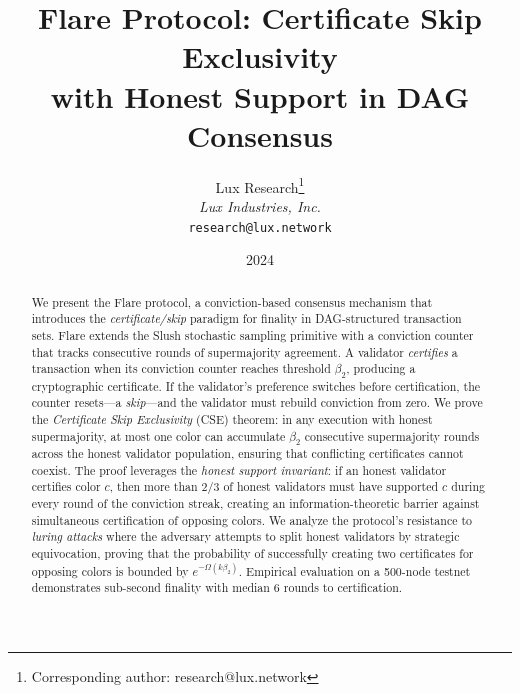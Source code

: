 \documentclass[11pt,a4paper]{article}
\title{\textbf{Flare Protocol: Certificate Skip Exclusivity\\with Honest Support in DAG Consensus}}
\author{
Lux Research\thanks{Corresponding author: research@lux.network}\\
\textit{Lux Industries, Inc.}\\
\texttt{research@lux.network}
}
\date{2024}
\begin{document}
\luxcoverpage

\begin{abstract}
We present the Flare protocol, a conviction-based consensus mechanism that introduces
the \emph{certificate/skip} paradigm for finality in DAG-structured transaction sets.
Flare extends the Slush stochastic sampling primitive with a conviction counter that
tracks consecutive rounds of supermajority agreement. A validator \emph{certifies} a
transaction when its conviction counter reaches threshold $\beta_2$, producing a
cryptographic certificate. If the validator's preference switches before certification,
the counter resets---a \emph{skip}---and the validator must rebuild conviction from zero.
We prove the \emph{Certificate Skip Exclusivity} (CSE) theorem: in any execution
with honest supermajority, at most one color can accumulate $\beta_2$ consecutive
supermajority rounds across the honest validator population, ensuring that conflicting
certificates cannot coexist. The proof leverages the \emph{honest support invariant}:
if an honest validator certifies color $c$, then more than $2/3$ of honest validators
must have supported $c$ during every round of the conviction streak, creating an
information-theoretic barrier against simultaneous certification of opposing colors.
We analyze the protocol's resistance to \emph{luring attacks} where the adversary
attempts to split honest validators by strategic equivocation, proving that the
probability of successfully creating two certificates for opposing colors is bounded by
$e^{-\Omega(k\beta_2)}$. Empirical evaluation on a 500-node testnet demonstrates
sub-second finality with median 6 rounds to certification.
\end{abstract}

\tableofcontents
\newpage











\end{document}
